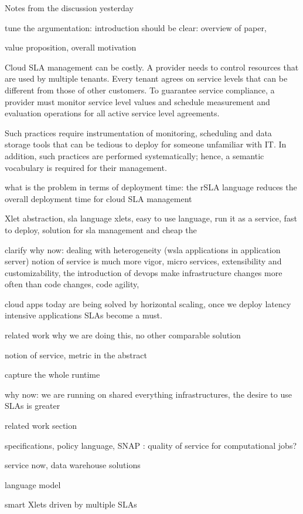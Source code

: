 Notes from the discussion yesterday

tune the argumentation: introduction should be clear: overview of paper, 

value proposition, overall motivation

Cloud SLA management can be costly. A provider needs to control resources that are used by multiple tenants. Every tenant agrees on service levels that can be different from those of other customers. To guarantee service compliance, a provider must monitor service level values and schedule measurement and evaluation operations for all active service level agreements. 

Such practices require instrumentation of monitoring, scheduling and data storage tools that can be tedious to deploy for someone unfamiliar with IT. In addition, such practices are performed systematically; hence, a semantic vocabulary is required for their management.

what is the problem in terms of deployment time: the rSLA language reduces the overall deployment time for cloud SLA management 

Xlet abstraction, 
sla language  xlets, easy to use language, run it as a service, fast to deploy, solution for sla management and cheap the 

clarify why now: dealing with heterogeneity (wsla applications in application server) notion of service is much more vigor, micro services,  extensibility and customizability, the introduction of devops make infrastructure changes more often than code changes, code agility, 

cloud apps today are being solved by horizontal scaling, once we deploy latency intensive applications SLAs become a must. 

related work why we are doing this, no other comparable solution

notion of service, metric in the abstract

capture the whole runtime

why now: we are running on shared everything infrastructures, the desire to use SLAs is greater

related work section

specifications, policy language, SNAP : quality of service for computational jobs? 

service now, data warehouse solutions

language model

smart Xlets driven by multiple SLAs

